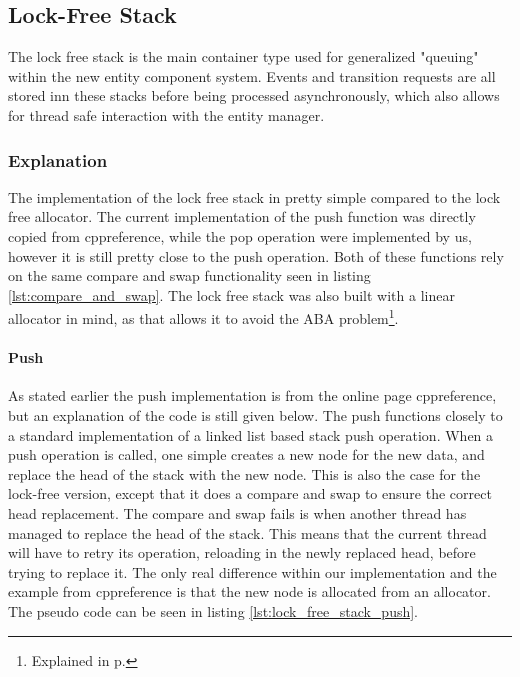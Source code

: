 \subsection{Lock-Free Stack}
\label{subsec:detailed_lock_free_stack}
The lock free stack is the main container type used for generalized "queuing" within
the new entity component system. Events and transition requests are all stored
inn these stacks before being processed asynchronously, which also
allows for thread safe interaction with the entity manager.


\subsubsection{Explanation}
The implementation of the lock free stack in pretty simple compared to the lock free allocator.
The current implementation of the push function was directly copied from cppreference\cite{cppreference_atomic_compare_exchange},
while the pop operation were implemented by us, however it is still pretty close to the push
operation.
Both of these functions rely on the same compare and swap functionality seen in listing \ref{lst:compare_and_swap}.
The lock free stack was also built with a linear allocator in mind, as that allows it to avoid the ABA problem\footnote{Explained in p.\pageref{par:detailed_lock_free_allocator_aba}}.

\paragraph{Push}
As stated earlier the push implementation is from the online page cppreference\cite{cppreference_atomic_compare_exchange},
but an explanation of the code is still given below.
The push functions closely to a standard implementation of a linked list based stack push operation.
When a push operation is called, one simple creates a new node for the new data,
and replace the head of the stack with the new node.
This is also the case for the lock-free version, except that it does a compare and swap
to ensure the correct head replacement.
The compare and swap fails is when another thread has managed to replace the head
of the stack. This means that the current thread will have to retry its operation,
reloading in the newly replaced head, before trying to replace it.
The only real difference within our implementation and the example from cppreference
is that the new node is allocated from an allocator.
The pseudo code can be seen in listing \ref{lst:lock_free_stack_push}.


